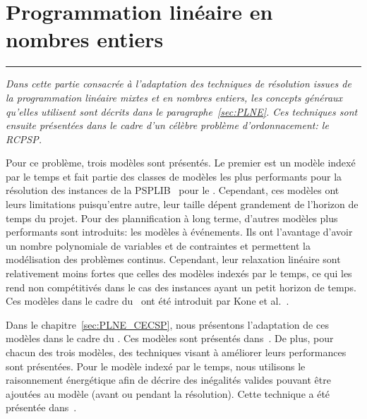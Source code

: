 

\cleardoublepage
\begin{minipage}{0.95\linewidth}
\part{Programmation linéaire en nombres entiers}
\label{part:PLNE}
\vspace{15mm} %
\parttoc 
\end{minipage}
\newpage
\thispagestyle{empty}
\begin{center}
  \begin{minipage}{\textwidth}
    \hrule
    \vspace{0.5cm}
    {\it Dans cette partie consacrée à l'adaptation des techniques de
      résolution issues de la programmation linéaire mixtes et en
      nombres entiers, les concepts généraux qu'elles utilisent sont
      décrits dans le paragraphe~\ref{sec:PLNE}. Ces techniques sont
      ensuite présentées dans le cadre d'un célèbre problème
      d'ordonnacement: le RCPSP. 

      Pour ce problème, trois modèles sont présentés. Le premier est
      un modèle indexé par le temps et fait partie des classes de modèles
      les plus performants pour la résolution des instances de la
      PSPLIB~\cite{PSPLIB} pour le \RCPSP. Cependant, ces modèles ont leurs
      limitations puisqu'entre autre, leur taille dépent grandement de
      l'horizon de temps du projet. Pour des plannification à long terme,
      d'autres modèles plus performants sont introduits: les modèles à
      événements. Ils ont l'avantage d'avoir un nombre polynomiale de
      variables et de contraintes et permettent la modélisation des
      problèmes continus. Cependant, leur relaxation linéaire sont
      relativement moins fortes que celles des modèles indexés par le temps,
      ce qui les rend non compétitivés dans le cas des instances ayant un
      petit horizon de temps. Ces modèles dans le cadre du \RCPSP~ont été
      introduit par Kone et al.~\cite{modele_RCPSP}.

      Dans le chapitre~\ref{sec:PLNE_CECSP}, nous présentons
      l'adaptation de ces modèles dans le cadre du \CECSP. Ces modèles
      sont présentés
      dans~\cite{Nattaf_Constraints,Nattaf_ORSpectrum,Nattaf_CPDP}. De plus,
      pour chacun des trois modèles, des techniques visant à améliorer leurs
      performances sont présentées. Pour le modèle indexé par le
      temps, nous utilisons le raisonnement énergétique afin de
      décrire des inégalités valides pouvant être ajoutées au modèle
      (avant ou pendant la résolution). Cette technique a été
      présentée dans~\cite{Nattaf_JFPC}.

}
\end{minipage}
\end{center}
